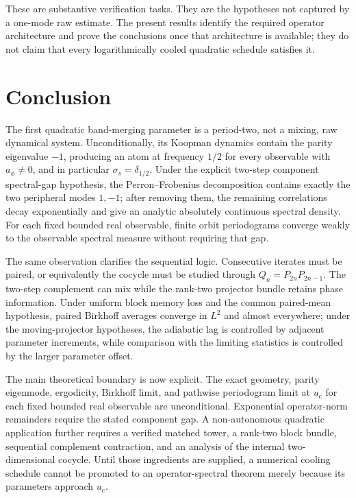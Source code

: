 \documentclass[11pt]{article}
\theoremstyle{definition}
\theoremstyle{remark}
\newcommand{\uc}{u_{\mathrm c}}
\begin{document}
These are substantive verification tasks.  They are the hypotheses not captured by a one-mode raw estimate.  The present results identify the required operator architecture and prove the conclusions once that architecture is available; they do not claim that every logarithmically cooled quadratic schedule satisfies it.

\section{Conclusion}

The first quadratic band-merging parameter is a period-two, not a mixing, raw dynamical system.  Unconditionally, its Koopman dynamics contain the parity eigenvalue $-1$, producing an atom at frequency $1/2$ for every observable with $a_\phi\ne0$, and in particular $\sigma_s=\delta_{1/2}$.  Under the explicit two-step component spectral-gap hypothesis, the Perron--Frobenius decomposition contains exactly the two peripheral modes $1,-1$; after removing them, the remaining correlations decay exponentially and give an analytic absolutely continuous spectral density.  For each fixed bounded real observable, finite orbit periodograms converge weakly to the observable spectral measure without requiring that gap.

The same observation clarifies the sequential logic.  Consecutive iterates must be paired, or equivalently the cocycle must be studied through $Q_n=P_{2n}P_{2n-1}$.  The two-step complement can mix while the rank-two projector bundle retains phase information.  Under uniform block memory loss and the common paired-mean hypothesis, paired Birkhoff averages converge in $L^2$ and almost everywhere; under the moving-projector hypotheses, the adiabatic lag is controlled by adjacent parameter increments, while comparison with the limiting statistics is controlled by the larger parameter offset.

The main theoretical boundary is now explicit.  The exact geometry, parity eigenmode, ergodicity, Birkhoff limit, and pathwise periodogram limit at $\uc$ for each fixed bounded real observable are unconditional.  Exponential operator-norm remainders require the stated component gap.  A non-autonomous quadratic application further requires a verified matched tower, a rank-two block bundle, sequential complement contraction, and an analysis of the internal two-dimensional cocycle.  Until those ingredients are supplied, a numerical cooling schedule cannot be promoted to an operator-spectral theorem merely because its parameters approach $\uc$.
\end{document}
